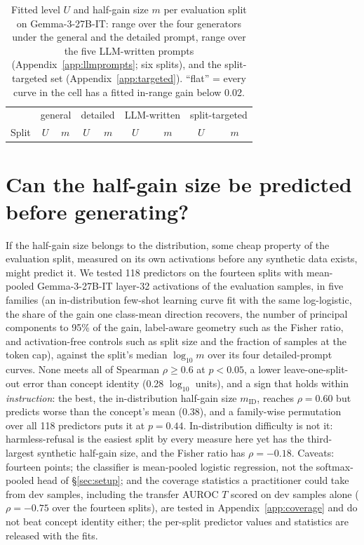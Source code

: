 \documentclass{article} %
\newcommand{\instr}{\emph{instruction}}
\begin{document}
\begin{table}[H]
  \caption{Fitted level $U$ and half-gain size $m$ per evaluation split on Gemma-3-27B-IT: range over the four generators under the general and the detailed prompt, range over the five LLM-written prompts (Appendix~\ref{app:llmprompts}; six splits), and the split-targeted set (Appendix~\ref{app:targeted}). ``flat'' = every curve in the cell has a fitted in-range gain below 0.02.}
  \label{tab:fit_splits}
  \centering\scriptsize
  \setlength{\tabcolsep}{4pt}
  \begin{tabular}{lcccccccc}
    \toprule
     & \multicolumn{2}{c}{general} & \multicolumn{2}{c}{detailed} & \multicolumn{2}{c}{LLM-written} & \multicolumn{2}{c}{split-targeted} \\
    Split & $U$ & $m$ & $U$ & $m$ & $U$ & $m$ & $U$ & $m$ \\
    \midrule
    
  \end{tabular}
\end{table}

\section{Can the half-gain size be predicted before generating?}
\label{app:predictor}
If the half-gain size belongs to the distribution, some cheap property of the evaluation split, measured on its own activations before any synthetic data exists, might predict it. We tested 118 predictors on the fourteen splits with mean-pooled Gemma-3-27B-IT layer-32 activations of the evaluation samples, in five families (an in-distribution few-shot learning curve fit with the same log-logistic, the share of the gain one class-mean direction recovers, the number of principal components to 95\% of the gain, label-aware geometry such as the Fisher ratio, and activation-free controls such as split size and the fraction of samples at the token cap), against the split's median $\log_{10} m$ over its four detailed-prompt curves. None meets all of Spearman $\rho\ge0.6$ at $p<0.05$, a lower leave-one-split-out error than concept identity (0.28 $\log_{10}$ units), and a sign that holds within \instr{}: the best, the in-distribution half-gain size $m_{\mathrm{ID}}$, reaches $\rho=0.60$ but predicts worse than the concept's mean (0.38), and a family-wise permutation over all 118 predictors puts it at $p=0.44$. In-distribution difficulty is not it: harmless-refusal is the easiest split by every measure here yet has the third-largest synthetic half-gain size, and the Fisher ratio has $\rho=-0.18$. Caveats: fourteen points; the classifier is mean-pooled logistic regression, not the softmax-pooled head of \S\ref{sec:setup}; and the coverage statistics a practitioner could take from dev samples, including the transfer AUROC $T$ scored on dev samples alone ($\rho=-0.75$ over the fourteen splits), are tested in Appendix~\ref{app:coverage} and do not beat concept identity either; the per-split predictor values and statistics are released with the fits.
\end{document}
